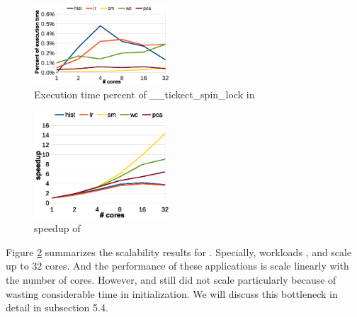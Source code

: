  
\begin{figure}[!h!t]  
	\centering
	\includegraphics[width=0.45\textwidth]{eps/dmr_spinlock.eps}
	\caption{Execution time percent of \_\_tickect\_spin\_lock in \myds}
	\label{fig:smr:spinlock}
\end{figure}

 


\begin{figure}[!h!t]  
	\centering
	\includegraphics[width=0.45\textwidth]{eps/dmr_speedup.eps}
	\caption{speedup of \myds}
	\label{fig:smr:speedup}
\end{figure}
Figure \ref{fig:smr:speedup} summarizes the scalability results for \myds.
Specially, workloads ,  and  scale up to 32 cores.
And the performance of these applications is scale linearly with the number of cores.
However,  and  still did not scale particularly because of wasting considerable time in initialization.
We will discuss this bottleneck in detail in subsection 5.4.





